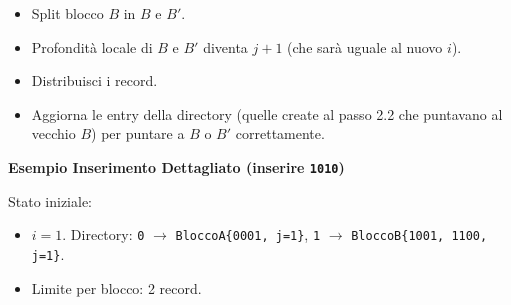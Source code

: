\begin{enumerate}
\begin{itemize}
\begin{enumerate}
            \begin{itemize}
                \item Split blocco $B$ in $B$ e $B'$.
                \item Profondità locale di $B$ e $B'$ diventa $j+1$ (che sarà uguale al nuovo $i$).
                \item Distribuisci i record.
                \item Aggiorna le entry della directory (quelle create al passo 2.2 che puntavano al vecchio $B$) per puntare a $B$ o $B'$ correttamente.
            \end{itemize}
        \end{enumerate}
    \end{itemize}
\end{enumerate}

\textbf{Esempio Inserimento Dettagliato (inserire \texttt{1010})}

Stato iniziale:
\begin{itemize}
    \item $i = 1$. Directory: \texttt{0} $\rightarrow$ \texttt{BloccoA\{0001, j=1\}}, \texttt{1} $\rightarrow$ \texttt{BloccoB\{1001, 1100, j=1\}}.
    \item Limite per blocco: 2 record.
\end{itemize}


